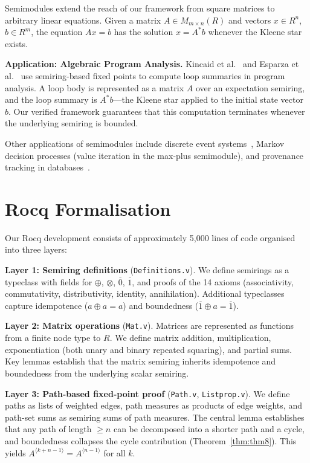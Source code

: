 \documentclass[a4paper,UKenglish,cleveref, autoref, thm-restate, anonymous]{lipics-v2021}
\begin{document}
Semimodules extend the reach of our framework from square matrices to
arbitrary linear equations. Given a matrix $A \in M_{m \times n}(R)$ and
vectors $x \in R^n$, $b \in R^m$, the equation $Ax = b$ has the solution
$x = A^{*}b$ whenever the Kleene star exists.

\textbf{Application: Algebraic Program Analysis.}
Kincaid et al.~\cite{kincaid2021algebraic} and Esparza et al.~\cite{esparza2010newtonian}
use semiring-based fixed points to compute loop summaries in program analysis.
A loop body is represented as a matrix $A$ over an expectation semiring, and
the loop summary is $A^{*}b$---the Kleene star applied to the initial state
vector $b$. Our verified framework guarantees that this computation terminates
whenever the underlying semiring is bounded.

Other applications of semimodules include discrete event systems~\cite{baccelli1992synchronization},
Markov decision processes (value iteration in the max-plus semimodule), and
provenance tracking in databases~\cite{10.1145/1265530.1265535}.

\section{Rocq Formalisation}
\label{sec:formalisation}

Our Rocq development consists of approximately 5,000 lines of code organised
into three layers:

\textbf{Layer 1: Semiring definitions} (\texttt{Definitions.v}).
We define semirings as a typeclass with fields for $\oplus$, $\otimes$,
$\overline{0}$, $\overline{1}$, and proofs of the 14 axioms (associativity,
commutativity, distributivity, identity, annihilation). Additional typeclasses
capture idempotence ($a \oplus a = a$) and boundedness
($\overline{1} \oplus a = \overline{1}$).

\textbf{Layer 2: Matrix operations} (\texttt{Mat.v}).
Matrices are represented as functions from a finite node type to $R$.
We define matrix addition, multiplication, exponentiation (both unary and
binary repeated squaring), and partial sums. Key lemmas establish that
the matrix semiring inherits idempotence and boundedness from the
underlying scalar semiring.

\textbf{Layer 3: Path-based fixed-point proof} (\texttt{Path.v}, \texttt{Listprop.v}).
We define paths as lists of weighted edges, path measures as products of
edge weights, and path-set sums as semiring sums of path measures.
The central lemma establishes that any path of length $\geq n$ can be
decomposed into a shorter path and a cycle, and boundedness collapses
the cycle contribution (Theorem~\ref{thm:thm8}). This yields
$A^{\langle k + n - 1 \rangle} = A^{\langle n - 1 \rangle}$ for all $k$.
\end{document}
